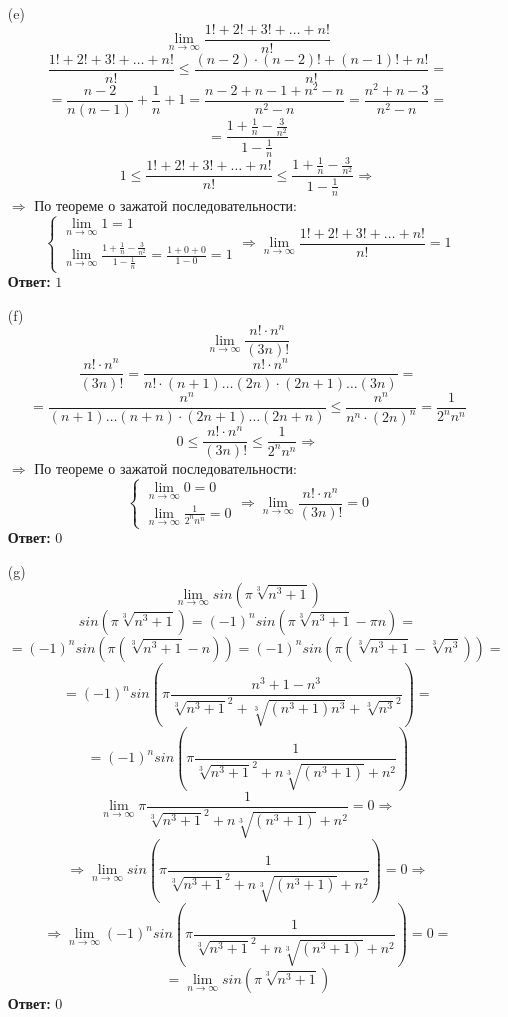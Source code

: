 \documentclass[a4paper]{article}
\renewcommand{\f}[2]{\frac{#1}{#2}}
\renewcommand{\r}{\Rightarrow}
\renewcommand{\leq}{\leqslant}
\begin{document}
\begin{enumerate}
\begin{enumerate}
        \item[(e)]
        $$\lim_{n \to \infty}\f{1! + 2! + 3! + \dots + n!}{n!}$$
        $$\f{1! + 2! + 3! + \dots + n!}{n!} \leq \f{(n-2)\cdot (n-2)! + (n-1)! + n!}{n!} = $$
        $$=\f{n-2}{n(n-1)}+\f{1}{n}+1 = \f{n-2+n-1+n^2-n}{n^2-n} = \f{n^2+n-3}{n^2-n} = $$
        $$=\f{1+\f{1}{n}-\f{3}{n^2}}{1-\f{1}{n}}$$
        $$1\leq \f{1! + 2! + 3! + \dots + n!}{n!} \leq \f{1+\f{1}{n}-\f{3}{n^2}}{1-\f{1}{n}}\r$$
        $\r$ По теореме о зажатой последовательности:
        $$\begin{cases}
            \lim_{n \to \infty}1 = 1 \\
            \lim_{n \to \infty}\f{1+\f{1}{n}-\f{3}{n^2}}{1-\f{1}{n}} = \f{1+0+0}{1-0} = 1
        \end{cases}\r \lim_{n \to \infty}\f{1! + 2! + 3! + \dots + n!}{n!} = 1$$
        \textbf{Ответ: }$1$

        \item[(f)]
        $$\lim_{n \to \infty}\f{n! \cdot n^n}{(3n)!}$$
        $$\f{n! \cdot n^n}{(3n)!} = \f{n! \cdot n^n}{n!\cdot (n+1)\dots(2n) \cdot (2n+1)\dots (3n)} = $$
        $$=\f{n^n}{(n+1)\dots(n+n) \cdot (2n+1)\dots (2n+n)} \leq \f{n^n}{n^n\cdot (2n)^n} = \f{1}{2^nn^n}$$
        $$0 \leq \f{n! \cdot n^n}{(3n)!} \leq \f{1}{2^nn^n} \r $$
        $\r$ По теореме о зажатой последовательности:
        $$\begin{cases}
            \lim_{n \to \infty}0 = 0 \\
            \lim_{n \to \infty}\f{1}{2^nn^n} = 0
        \end{cases}\r \lim_{n \to \infty}\f{n! \cdot n^n}{(3n)!} = 0$$
        \textbf{Ответ:} $0$

        \item[(g)]
        $$\lim_{n \to \infty} sin(\pi \sqrt[3]{n^3+1})$$
        $$sin(\pi \sqrt[3]{n^3+1}) = (-1)^n sin(\pi \sqrt[3]{n^3+1} - \pi n) = $$
        $$= (-1)^n sin(\pi (\sqrt[3]{n^3+1} - n)) = (-1)^n sin(\pi (\sqrt[3]{n^3+1} - \sqrt[3]{n^3})) = $$
        $$= (-1)^n sin(\pi \f{n^3+1 - n^3}{\sqrt[3]{n^3+1}^2+\sqrt[3]{(n^3+1)n^3}+\sqrt[3]{n^3}^2}) = $$
        $$=(-1)^n sin(\pi \f{1}{\sqrt[3]{n^3+1}^2+n\sqrt[3]{(n^3+1)}+n^2})$$
        $$\lim_{n \to \infty}\pi \f{1}{\sqrt[3]{n^3+1}^2+n\sqrt[3]{(n^3+1)}+n^2} = 0 \r$$
        $$\r \lim_{n \to \infty}sin(\pi \f{1}{\sqrt[3]{n^3+1}^2+n\sqrt[3]{(n^3+1)}+n^2}) = 0 \r$$
        $$\r \lim_{n \to \infty} (-1)^n sin(\pi \f{1}{\sqrt[3]{n^3+1}^2+n\sqrt[3]{(n^3+1)}+n^2}) = 0 =$$
        $$= \lim_{n \to \infty} sin(\pi \sqrt[3]{n^3+1})$$
        \textbf{Ответ:} $0$
    \end{enumerate}
\end{enumerate}
\end{document}
